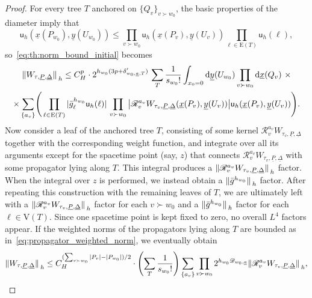 \documentclass[a4paper, 11pt]{article}
\newcommand{\sing}[2]{{#1}^{#2}}							%
\newcommand{\kren}{\mathscr{R}}								%
\newcommand{\vrt}{\mathrm{V}}								%
\newcommand{\edg}{\mathrm{E}}								%
\newcommand{\weight}{\mathsf{u}}							%
\theoremstyle{thm}
\begin{document}
\begin{proof}
For every tree $T$ anchored on $\lbrace Q_v \rbrace_{v \succ w_0}$, the basic properties of the diameter imply that
\begin{equation}
\weight_h(\underline{x}(P_{w_0}), \underline{y}(U_{w_0})) \le \prod_{v \succ w_0} \weight_h(\underline{x}(P_v), \underline{y}(U_v)) \prod_{\ell \in \edg(T)} \weight_h(\ell),
\end{equation}
so~\eqref{eq:th:norm_bound_initial} becomes
\begin{multline}
\label{eq:th:norm_estimate_BBF}
\norm*{W_{\tau, \underline{P}, \underline{\Delta}}}_h \le C_H^p \cdot 2^{h_{w_0}(3p + \delta'_{w_0, \underline{a}, T})} \, \sum_T \frac{1}{s_{w_0}!} \int_{x_0 = 0} \dd{\underline{y}(U_{w_0})} \prod_{v \succ w_0} \dd{\underline{x}(Q_v)} \, \times \\
\times \sum_{\lbrace a_v \rbrace} \Biggl( \, \prod_{\ell \in \edg(T)} \abs*{\sing{\bar{g}}{h_{w_0}}_\ell \weight_h(\ell)} \prod_{v \succ w_0} \abs{\kren_v^{a_v} W_{\tau_v, \underline{P}, \underline{\Delta}}(\underline{x}(P_v), \underline{y}(U_v))} \weight_h(\underline{x}(P_v), \underline{y}(U_v)) \Biggr).
\end{multline}
Now consider a leaf of the anchored tree $T$, consisting of some kernel $\kren_v^{a_v} W_{\tau_v, \underline{P}, \underline{\Delta}}$ together with the corresponding weight function, and integrate over all its arguments except for the spacetime point (say, $z$) that connects $\kren_v^{a_v} W_{\tau_v, \underline{P}, \underline{\Delta}}$ with some propagator lying along $T$. This integral produces a $\norm*{\kren_v^{a_v} W_{\tau_v, \underline{P}, \underline{\Delta}}}_h$ factor. When the integral over $z$ is performed, we instead obtain a $\norm*{\sing{\bar{g}}{h_{w_0}}}_h$ factor. After repeating this construction with the remaining leaves of $T$, we are ultimately left with a $\norm*{\kren_v^{a_v} W_{\tau_v, \underline{P}, \underline{\Delta}}}_h$ factor for each $v \succ w_0$ and a $\norm*{\sing{\bar{g}}{h_{w_0}}}_h$ factor for each $\ell \in \vrt(T)$. Since one spacetime point is kept fixed to zero, no overall $L^4$ factors appear. If the weighted norms of the propagators lying along $T$ are bounded as in~\eqref{eq:propagator_weighted_norm}, we eventually obtain
\begin{equation}
\label{eq:th:bound_after_BBF}
\norm*{W_{\tau, \underline{P}, \underline{\Delta}}}_h \le C_H^{(\sum_{v \succ w_0} \abs*{P_v} - \abs*{P_{w_0}})/2} \cdot \left( \sum_T \frac{1}{s_{w_0}!} \right) \sum_{\lbrace a_v \rbrace} \prod_{v \succ w_0} 2^{h_{w_0}\mathscr{D}_{w_0, \underline{a}}} \norm*{\kren_v^{a_v} W_{\tau_v, \underline{P}, \underline{\Delta}}}_h,

\end{equation}
\end{proof}
\end{document}
